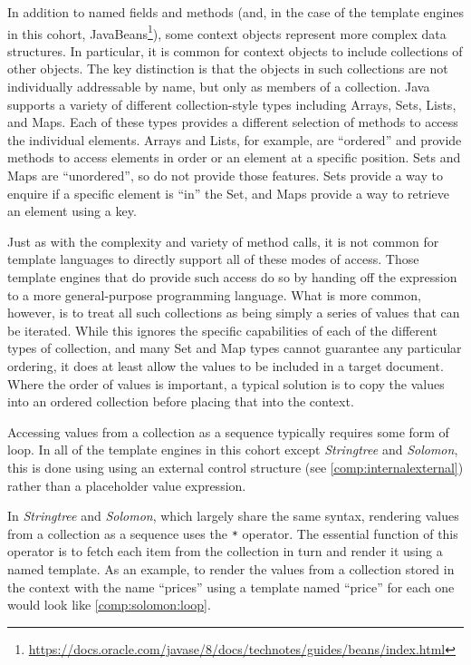 In addition to named fields and methods (and, in the case of the \gls{template engine}s in this cohort, \gls{JavaBeans}\footnote{\url{https://docs.oracle.com/javase/8/docs/technotes/guides/beans/index.html}}), some context objects represent more complex data structures. In particular, it is common for context objects to include collections of other objects. The key distinction is that the objects in such collections are not individually addressable by name, but only as members of a collection. Java supports a variety of different collection-style types including Arrays, Sets, Lists, and Maps. Each of these types provides a different selection of methods to access the individual elements. Arrays and Lists, for example, are \enquote{ordered} and provide methods to access elements in order or an element at a specific position. Sets and Maps are \enquote{unordered}, so do not provide those features. Sets provide a way to enquire if a specific element is \enquote{in} the Set, and Maps provide a way to retrieve an element using a key.

\label{A185}
Just as with the complexity and variety of method calls, it is not common for \gls{template language}s to directly support all of these modes of access. Those \gls{template engine}s that do provide such access do so by handing off the expression to a more general-purpose \gls{programming language}. What is more common, however, is to treat all such collections as being simply a series of values that can be iterated. While this ignores the specific capabilities of each of the different types of collection, and many Set and Map types cannot guarantee any particular ordering, it does at least allow the values to be included in a target document. Where the order of values is important, a typical solution is to copy the values into an ordered collection before placing that into the context.

Accessing values from a collection as a sequence typically requires some form of loop. In all of the \gls{template engine}s in this cohort except \emph{Stringtree} and \emph{Solomon}, this is done using using an external control structure (see \autoref{comp:internalexternal}) rather than a placeholder value expression.

In \emph{Stringtree} and \emph{Solomon}, which largely share the same syntax, rendering values from a collection as a sequence uses the \verb!*! operator. The essential function of this operator is to fetch each item from the collection in turn and render it using a named template. As an example, to render the values from a collection stored in the context with the name \enquote{prices} using a template named \enquote{price} for each one would look like \autoref{comp:solomon:loop}.

